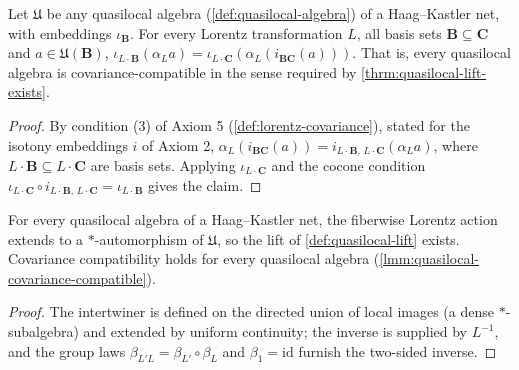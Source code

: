 \begin{lemma}
    \label{lmm:quasilocal-covariance-compatible}
    \leanok
    Let $\mathfrak{U}$ be any quasilocal algebra (\ref{def:quasilocal-algebra}) of a Haag--Kastler net, with embeddings $\iota_{\mathbf{B}}$. For every Lorentz transformation $L$, all basis sets $\mathbf{B} \subseteq \mathbf{C}$ and $a \in \mathfrak{U}(\mathbf{B})$, $\iota_{L\cdot\mathbf{B}}(\alpha_L a) = \iota_{L\cdot\mathbf{C}}(\alpha_L(i_{\mathbf{B}\mathbf{C}}(a)))$. That is, every quasilocal algebra is covariance-compatible in the sense required by \ref{thrm:quasilocal-lift-exists}.
\end{lemma}
\begin{proof}
    \leanok
    By condition (3) of Axiom 5 (\ref{def:lorentz-covariance}), stated for the isotony embeddings $i$ of Axiom 2, $\alpha_L(i_{\mathbf{B}\mathbf{C}}(a)) = i_{L\cdot\mathbf{B},\,L\cdot\mathbf{C}}(\alpha_L a)$, where $L\cdot\mathbf{B} \subseteq L\cdot\mathbf{C}$ are basis sets. Applying $\iota_{L\cdot\mathbf{C}}$ and the cocone condition $\iota_{L\cdot\mathbf{C}} \circ i_{L\cdot\mathbf{B},\,L\cdot\mathbf{C}} = \iota_{L\cdot\mathbf{B}}$ gives the claim.
\end{proof}

\begin{theorem}
    \label{thrm:quasilocal-lift-exists}
    \leanok
    For every quasilocal algebra of a Haag--Kastler net, the fiberwise Lorentz action extends to a $*$-automorphism of $\mathfrak{U}$, so the lift of \ref{def:quasilocal-lift} exists. Covariance compatibility holds for every quasilocal algebra (\ref{lmm:quasilocal-covariance-compatible}).
\end{theorem}
\begin{proof}
    \leanok
    The intertwiner is defined on the directed union of local images (a dense $*$-subalgebra) and extended by uniform continuity; the inverse is supplied by $L^{-1}$, and the group laws $\beta_{L'L} = \beta_{L'}\circ\beta_L$ and $\beta_{1} = \mathrm{id}$ furnish the two-sided inverse.
\end{proof}

